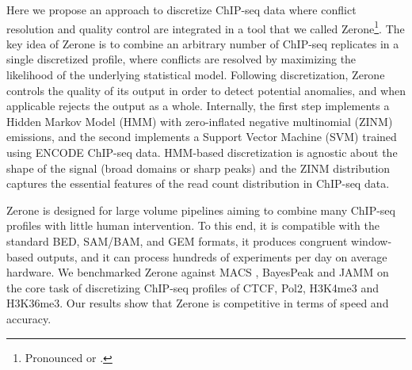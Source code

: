 \documentclass{bioinfo}
\begin{document}
Here we propose an approach to discretize ChIP-seq data where conflict
resolution and quality control are integrated in a tool that we called
Zerone\footnote{Pronounced  or
.}.
The key idea of Zerone is to combine an arbitrary number of
ChIP-seq replicates in a single discretized profile, where conflicts are
resolved by maximizing the likelihood of the underlying statistical model.
Following discretization, Zerone controls the quality of its output in
order to detect potential anomalies, and when applicable rejects the
output as a whole. Internally, the first step implements a Hidden Markov
Model (HMM) with zero-inflated negative multinomial (ZINM) emissions, and
the second implements a Support Vector Machine (SVM) trained using ENCODE
ChIP-seq data. HMM-based discretization is agnostic about
the shape of the signal (broad domains or sharp peaks) and the ZINM
distribution captures the essential features of the read count
distribution in ChIP-seq data.

Zerone is designed for large volume pipelines aiming to combine many
ChIP-seq profiles with little human intervention. To this end, it is
compatible with the standard BED, SAM/BAM, and GEM formats,
it produces congruent window-based outputs, and it can process hundreds
of experiments per day on average hardware. We benchmarked Zerone against
MACS \citep{pmid18798982}, BayesPeak \citep{pmid19772557} and
JAMM \citep{pmid25223640} on the core task of discretizing ChIP-seq
profiles of CTCF, Pol2, H3K4me3 and H3K36me3. Our results show that Zerone is
competitive in terms of speed and accuracy.
\end{document}

